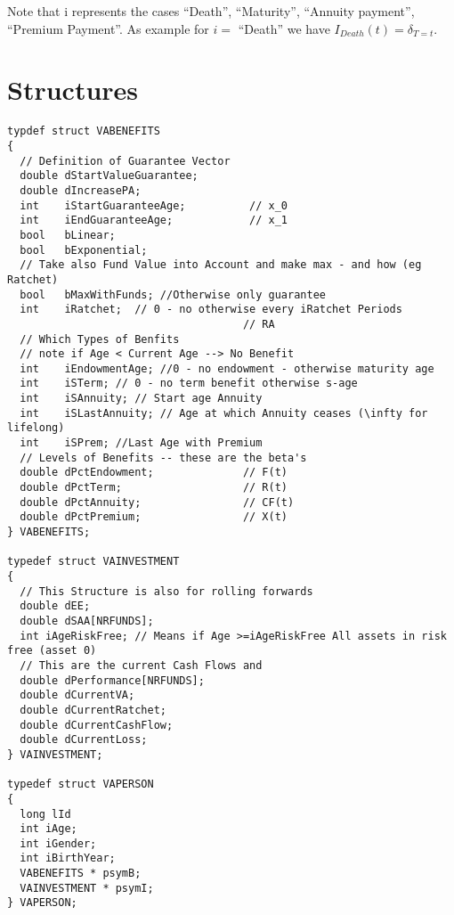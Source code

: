 \documentclass[10pt, a4paper,landscape]{article}
\begin{document}
Note that i represents the cases ``Death'', ``Maturity'', ``Annuity payment'', ``Premium Payment''. As example for $i=$ ``Death'' we have $I_{Death}(t) =\delta_{T=t}$.





\section{Structures}
\begin{verbatim}
typdef struct VABENEFITS
{
  // Definition of Guarantee Vector
  double dStartValueGuarantee; 
  double dIncreasePA;
  int    iStartGuaranteeAge;          // x_0
  int    iEndGuaranteeAge;            // x_1
  bool   bLinear;
  bool   bExponential;
  // Take also Fund Value into Account and make max - and how (eg Ratchet)
  bool   bMaxWithFunds; //Otherwise only guarantee
  int    iRatchet;  // 0 - no otherwise every iRatchet Periods
                                     // RA
  // Which Types of Benfits
  // note if Age < Current Age --> No Benefit
  int    iEndowmentAge; //0 - no endowment - otherwise maturity age
  int    iSTerm; // 0 - no term benefit otherwise s-age
  int    iSAnnuity; // Start age Annuity
  int    iSLastAnnuity; // Age at which Annuity ceases (\infty for lifelong)
  int    iSPrem; //Last Age with Premium 
  // Levels of Benefits -- these are the beta's
  double dPctEndowment;              // F(t)
  double dPctTerm;                   // R(t)
  double dPctAnnuity;                // CF(t)
  double dPctPremium;                // X(t)
} VABENEFITS;

typedef struct VAINVESTMENT
{
  // This Structure is also for rolling forwards
  double dEE;
  double dSAA[NRFUNDS];
  int iAgeRiskFree; // Means if Age >=iAgeRiskFree All assets in risk free (asset 0) 
  // This are the current Cash Flows and 
  double dPerformance[NRFUNDS];
  double dCurrentVA;
  double dCurrentRatchet;
  double dCurrentCashFlow;
  double dCurrentLoss;
} VAINVESTMENT;

typedef struct VAPERSON
{
  long lId
  int iAge;
  int iGender;
  int iBirthYear;
  VABENEFITS * psymB;
  VAINVESTMENT * psymI; 
} VAPERSON;
\end{verbatim}


\end{document}
